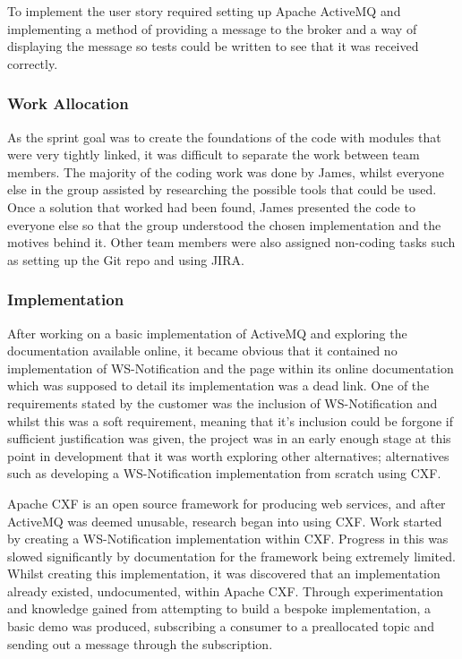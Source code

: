 \documentclass[a4paper, 12pt, twoside]{article}
\begin{document}
To implement the user story required setting up Apache ActiveMQ \cite{activeMQ} and implementing a method of providing a message to the broker and a way of displaying the message so tests could be written to see that it was received correctly.

\subsubsection{Work Allocation}

As the sprint goal was to create the foundations of the code with modules that were very tightly linked, it was difficult to separate the work between team members. The majority of the coding work was done by James, whilst everyone else in the group assisted by researching the possible tools that could be used. Once a solution that worked had been found, James presented the code to everyone else so that the group understood the chosen implementation and the motives behind it. Other team members were also assigned non-coding tasks such as setting up the Git repo and using JIRA.

\subsubsection{Implementation}

After working on a basic implementation of ActiveMQ and exploring the documentation available online, it became obvious that it contained no implementation of WS-Notification and the page within its online documentation which was supposed to detail its implementation was a dead link. One of the requirements stated by the customer was the inclusion of WS-Notification and whilst this was a soft requirement, meaning that it's inclusion could be forgone if sufficient justification was given, the project was in an early enough stage at this point in development that it was worth exploring other alternatives; alternatives such as developing a WS-Notification implementation from scratch using CXF.

Apache CXF is an open source framework for producing web services, and after ActiveMQ was deemed unusable, research began into using CXF. Work started by creating a WS-Notification implementation within CXF. Progress in this was slowed significantly by documentation for the framework being extremely limited. Whilst creating this implementation, it was discovered that an implementation already existed, undocumented, within Apache CXF. Through experimentation and knowledge gained from attempting to build a bespoke implementation, a basic demo was produced, subscribing a consumer to a preallocated topic and sending out a message through the subscription.
\end{document}
